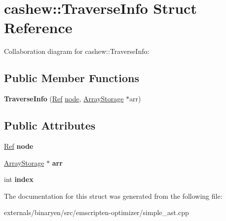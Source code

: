 \hypertarget{structcashew_1_1_traverse_info}{}\section{cashew\+:\+:Traverse\+Info Struct Reference}
\label{structcashew_1_1_traverse_info}


Collaboration diagram for cashew\+:\+:Traverse\+Info\+:
\subsection*{Public Member Functions}
\begin{DoxyCompactItemize}
\item 
\mbox{\label{structcashew_1_1_traverse_info_a08f0401567cc2cd3a304848eb442ded2}} 
{\bfseries Traverse\+Info} (\mbox{\hyperlink{structcashew_1_1_ref}{Ref}} \mbox{\hyperlink{structnode}{node}}, \mbox{\hyperlink{classcashew_1_1_array_storage}{Array\+Storage}} $\ast$arr)
\end{DoxyCompactItemize}
\subsection*{Public Attributes}
\begin{DoxyCompactItemize}
\item 
\mbox{\label{structcashew_1_1_traverse_info_a5c51d5fc3b6e64e22e07f6a3034c1de0}} 
\mbox{\hyperlink{structcashew_1_1_ref}{Ref}} {\bfseries node}
\item 
\mbox{\label{structcashew_1_1_traverse_info_a0ce7345da55c62bca3f29b65512fb7fa}} 
\mbox{\hyperlink{classcashew_1_1_array_storage}{Array\+Storage}} $\ast$ {\bfseries arr}
\item 
\mbox{\label{structcashew_1_1_traverse_info_a4fa682c72d76b0c7e2739d7cf33ac5b0}} 
int {\bfseries index}
\end{DoxyCompactItemize}


The documentation for this struct was generated from the following file\+:\begin{DoxyCompactItemize}
\item 
externals/binaryen/src/emscripten-\/optimizer/simple\+\_\+ast.\+cpp\end{DoxyCompactItemize}
